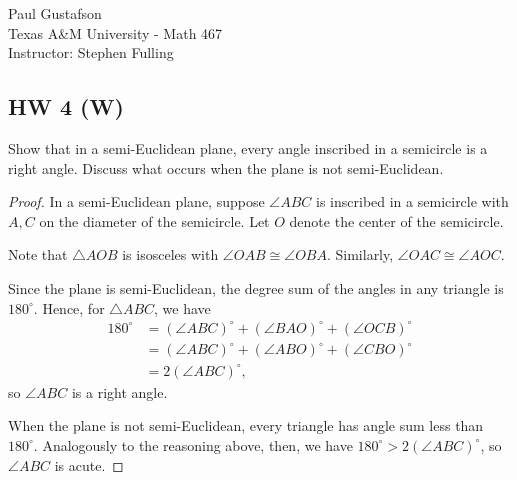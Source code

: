 \documentclass{article}
\begin{document}
\noindent Paul Gustafson\\
\noindent Texas A\&M University - Math 467\\ 
\noindent Instructor: Stephen Fulling

\subsection*{HW 4 (W)}
 Show that in a semi-Euclidean plane, every angle inscribed in a semicircle is a right angle.  Discuss what occurs when the plane is not semi-Euclidean.
\begin{proof}
In a semi-Euclidean plane, suppose $\angle ABC$ is inscribed in a semicircle with $A, C$ on the diameter of the semicircle. Let $O$ denote the center of the semicircle.

Note that $\triangle AOB$ is isosceles with $\angle OAB \cong \angle OBA$.  Similarly, $\angle OAC \cong \angle AOC$. 

Since the plane is semi-Euclidean, the degree sum of the angles in any triangle is $180^\circ$. Hence, for $\triangle ABC$, we have
\begin{align*}
180^\circ & = (\angle ABC)^\circ + (\angle BAO)^\circ + (\angle OCB)^\circ
\\ & = (\angle ABC)^\circ + (\angle ABO)^\circ + (\angle CBO)^\circ
\\ & = 2 (\angle ABC)^\circ,
\end{align*}
so $\angle ABC$ is a right angle.

When the plane is not semi-Euclidean, every triangle has angle sum less than $180^\circ$. Analogously to the reasoning above, then, we have $180^\circ >  2 (\angle ABC)^\circ$, so $\angle ABC$ is acute.
\end{proof}
\end{document}
